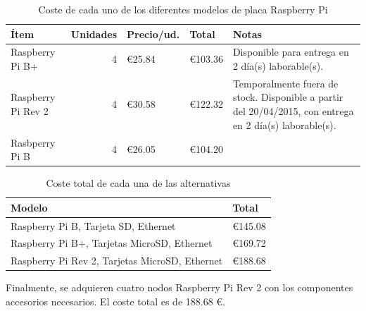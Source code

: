\begin{table}[H]
\begin{tabular}{|l|r|l|l|p{4.5cm}|}
\hline
\textbf{Ítem}&\textbf{Unidades}&\textbf{Precio}/ud.&\textbf{Total}&\textbf{Notas}\\
\hline
Raspberry Pi B+&4&€25.84&€103.36&Disponible para entrega en 2 día(s) laborable(s).\\%
\hline
Raspberry Pi Rev 2&4&€30.58&€122.32&Temporalmente fuera de stock. Disponible a partir del 20/04/2015, con entrega en 2 día(s) laborable(s).\\%
\hline
Rasbperry Pi B&4&€26.05&€104.20&\\%
\hline
\end{tabular}
\caption{Coste de cada uno de los diferentes modelos de placa Raspberry Pi}
\end{table}



\begin{table}[H]
\centering
\begin{tabular}{|l|l|}\hline
\textbf{Modelo}&\textbf{Total}\\
\hline
Raspberry Pi B, Tarjeta SD, Ethernet&€145.08\\
\hline
Raspberry Pi B+, Tarjetas MicroSD, Ethernet&€169.72\\
\hline
Raspberry Pi Rev 2, Tarjetas MicroSD, Ethernet&€188.68\\
\hline
\end{tabular}
\caption{Coste total de cada una de las alternativas}
\end{table}

Finalmente, se adquieren cuatro nodos Raspberry Pi Rev 2 con los componentes accesorios necesarios. El coste total es de 188.68 €.